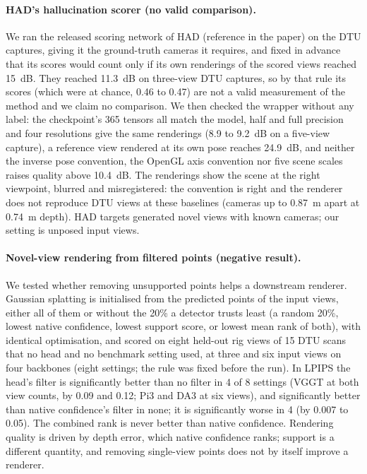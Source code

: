 \paragraph{HAD's hallucination scorer (no valid comparison).}
We ran the released scoring network of HAD (reference in the paper) on the DTU captures, giving it the ground-truth cameras it requires, and fixed in advance that its scores would count only if its own renderings of the scored views reached 15~dB. They reached 11.3~dB on three-view DTU captures, so by that rule its scores (which were at chance, \auroc{} 0.46 to 0.47) are not a valid measurement of the method and we claim no comparison. We then checked the wrapper without any label: the checkpoint's 365 tensors all match the model, half and full precision and four resolutions give the same renderings (8.9 to 9.2~dB on a five-view capture), a reference view rendered at its own pose reaches 24.9~dB, and neither the inverse pose convention, the OpenGL axis convention nor five scene scales raises quality above 10.4~dB. The renderings show the scene at the right viewpoint, blurred and misregistered: the convention is right and the renderer does not reproduce DTU views at these baselines (cameras up to 0.87~m apart at 0.74~m depth). HAD targets generated novel views with known cameras; our setting is unposed input views.

\paragraph{Novel-view rendering from filtered points (negative result).}
We tested whether removing unsupported points helps a downstream renderer. Gaussian splatting is initialised from the predicted points of the input views, either all of them or without the 20\% a detector trusts least (a random 20\%, lowest native confidence, lowest support score, or lowest mean rank of both), with identical optimisation, and scored on eight held-out rig views of 15 DTU scans that no head and no benchmark setting used, at three and six input views on four backbones (eight settings; the rule was fixed before the run). In LPIPS the head's filter is significantly better than no filter in 4 of 8 settings (VGGT at both view counts, by 0.09 and 0.12; Pi3 and DA3 at six views), and significantly better than native confidence's filter in none; it is significantly worse in 4 (by 0.007 to 0.05). The combined rank is never better than native confidence. Rendering quality is driven by depth error, which native confidence ranks; support is a different quantity, and removing single-view points does not by itself improve a renderer.

